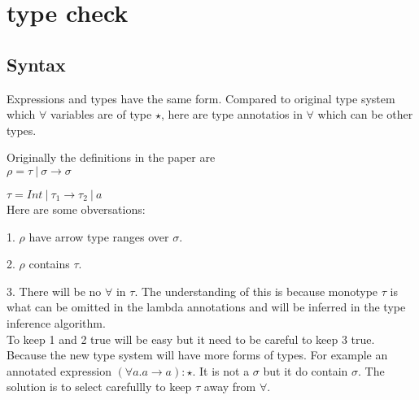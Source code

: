 \newcommand{\tpmapsto}[3]{#2\mapsto#3}
\newcommand{\castupe}{\ensuremath{\mathsf{cast}^{\uparrow}\ }}
\newcommand{\castdowne}{\ensuremath{\mathsf{cast}^{\downarrow}\ }}
\newcommand{\judge}{\Gamma\vdash}
\newcommand{\forallvars}[1]{\forall \overbar{#1}}
\newcommand{\olpolymorphic}[2]{\vdash^{ol} #1 \sqsubseteq #2}


\iffalse
\section{type check}

\subsection{Syntax}

Expressions and types have the same form. Compared to original type system which $\forall$ variables are of type $\star$, here are type annotatios in $\forall$ which can be other types. \\

\gram{\otte\ottinterrule}

Originally the definitions in the paper are\\

$\rho = \tau\ |\ \sigma \to \sigma$

$\tau = Int\ |\ \tau_1 \to \tau_2\ |\ a$
\\[2.0mm]

Here are some obversations:

1. $\rho$ have arrow type ranges over $\sigma$.

2. $\rho$ contains $\tau$.

3. There will be no $\forall$ in $\tau$. The understanding of this is because monotype $\tau$ is what can be omitted in the lambda annotations and will be inferred in the type inference algorithm.\\

To keep 1 and 2 true will be easy but it need to be careful to keep 3 true. Because the new type system will have more forms of types. For example an annotated expression $(\forall a. a \to a):\star$. It is not a $\sigma$ but it do contain $\sigma$. The solution is to select carefullly to keep $\tau$ away from $\forall$. \\

\gram{\ottR\ottinterrule}

\gram{ \ottt\ottinterrule}




